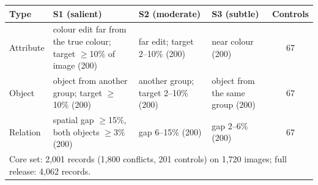 \begin{tabular}{l>{\raggedright\arraybackslash}p{3.4cm}>{\raggedright\arraybackslash}p{2.4cm}>{\raggedright\arraybackslash}p{2.4cm}c}
\toprule
Type & S1 (salient) & S2 (moderate) & S3 (subtle) & Controls \\
\midrule
Attribute & colour edit far from the true colour; target $\geq$10\% of image (200) & far edit; target 2--10\% (200) & near colour (200) & 67 \\
Object & object from another group; target $\geq$10\% (200) & another group; target 2--10\% (200) & object from the same group (200) & 67 \\
Relation & spatial gap $\geq$15\%, both objects $\geq$3\% (200) & gap 6--15\% (200) & gap 2--6\% (200) & 67 \\
\midrule
\multicolumn{5}{l}{Core set: 2,001 records (1,800 conflicts, 201 controls) on 1,720 images; full release: 4,062 records.} \\
\bottomrule
\end{tabular}
